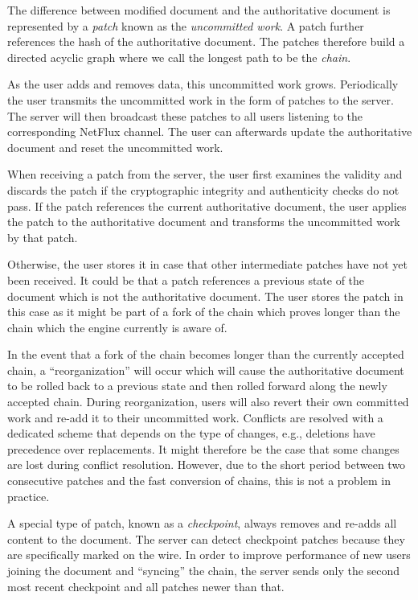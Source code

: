 The difference between modified document and the authoritative document is represented by a \textit{patch} known as the \textit{uncommitted work}.
A patch further references the  hash of the authoritative document.
The patches therefore build a directed acyclic graph where we call the longest path to be the \textit{chain}.

As the user adds and removes data, this uncommitted work grows.
Periodically the user transmits the uncommitted work in the form of patches to the server.
The server will then broadcast these patches to all users listening to the corresponding NetFlux channel.
The user can afterwards update the authoritative document and reset the uncommitted work.

When receiving a patch from the server, the user first examines the validity and discards the patch if the cryptographic integrity and authenticity checks do not pass.
If the patch references the current authoritative document, the user applies the patch to the authoritative document and transforms the uncommitted work by that patch.

Otherwise, the user stores it in case that other intermediate patches have not yet been received.
It could be that a patch references a previous state of the document which is not the authoritative document.
The user stores the patch in this case as it might be part of a fork of the chain which proves longer than the chain which the engine currently is aware of.

In the event that a fork of the chain becomes longer than the currently accepted chain, a \enquote{reorganization} will occur which will cause the authoritative document to be rolled back to a previous state and then rolled forward along the newly accepted chain.
During reorganization, users will also revert their own committed work and re-add it to their uncommitted work.
Conflicts are resolved with a dedicated scheme that depends on the type of changes, e.g., deletions have precedence over replacements.
It might therefore be the case that some changes are lost during conflict resolution.
However, due to the short period between two consecutive patches and the fast conversion of chains, this is not a problem in practice.

A special type of patch, known as a \textit{checkpoint}, always removes and re-adds all content to the document.
The server can detect checkpoint patches because they are specifically marked on the wire.
In order to improve performance of new users joining the document and \enquote{syncing} the chain, the server sends only the second most recent checkpoint and all patches newer than that.


